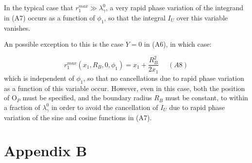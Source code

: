 \documentclass [12pt]{article}
\begin{document}
{  In the typical case that $r_1^{max} \gg \lambda_{\gamma}^0$, a very rapid phase variation 
  of the integrand in (A7) occurs as a function of $\phi_1$, so that the integral $I_U$ 
   over this variable vanishes.
   \par An possible exception to this is the case $Y = 0$ in (A6), in which case:

  \[  r_1^{max}(x_1,R_B,0,\phi_1) = x_1 + \frac{R_B^2}{2 x_1}~~~~~~(A8)\]
     which is independent of  $\phi_1$, so that no cancellations due to rapid phase variation
    as a function of this variable occur.
   However, even in this case, both the position of O$_P$ must be specified, and the boundary radius
     $R_B$ must be constant, to within a fraction of $\lambda_{\gamma}^0$ in order to avoid the 
    cancellation of $I_U$ due to rapid phase variation of the sine and cosine 
    functions in (A7).


 \newpage
  \section*{\bf Appendix B}

}
\end{document}
